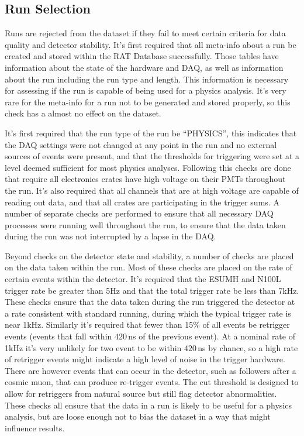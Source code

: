 \subsection{Run Selection}
Runs are rejected from the dataset if they fail to meet certain criteria
for data quality and detector stability.
It's first required that all meta-info about a run be created and stored
within the RAT Database successfully.
Those tables have information about the state of the hardware and DAQ, as
well as information about the run including the run type and length.
This information is necessary for assessing if the run is capable of being
used for a physics analysis.
It's very rare for the meta-info for a run not to be generated and stored
properly, so this check has a almost no effect on the dataset.

It's first required that the run type of the run be ``PHYSICS'', this indicates
that the DAQ settings were not changed at any point in the run and no external
sources of events were present, and that the thresholds for triggering were set
at a level deemed sufficient for most physics analyses.
Following this checks are done
that require all electronics crates have high voltage on their PMTs throughout
the run.
It's also required that all channels that are at high voltage are capable of
reading out data, and that all crates are participating in the trigger sums.
A number of separate checks are performed to ensure that all necessary DAQ
processes were running well throughout the run, to ensure that the data taken
during the run was not interrupted by a lapse in the DAQ.\@

Beyond checks on the detector state and stability, a number of checks
are placed on the data taken within the run.
Most of these checks are placed on the rate of certain events within the detector.
It's required that the ESUMH and N100L trigger rate be greater than 5Hz and
that the total trigger rate be less than 7kHz.
These checks ensure that the data taken during the run triggered the detector
at a rate consistent with standard running, during which the typical trigger
rate is near 1kHz.
Similarly it's required that fewer than 15\% of all events be retrigger events
(events that fall within 420\,ns of the previous event).
At a nominal rate of 1kHz it's very unlikely for two event to be within $420$\,ns
by chance, so a high rate of retrigger events might indicate a high level
of noise in the trigger hardware. There are however events that can occur
in the detector, such as followers after a cosmic muon, that can produce
re-trigger events.
The cut threshold is designed to allow for retriggers from natural source but
still flag detector abnormalities.
These checks all ensure that the data in a run is likely to be useful for
a physics analysis, but are loose enough not to bias the dataset in a way that
might influence results.
